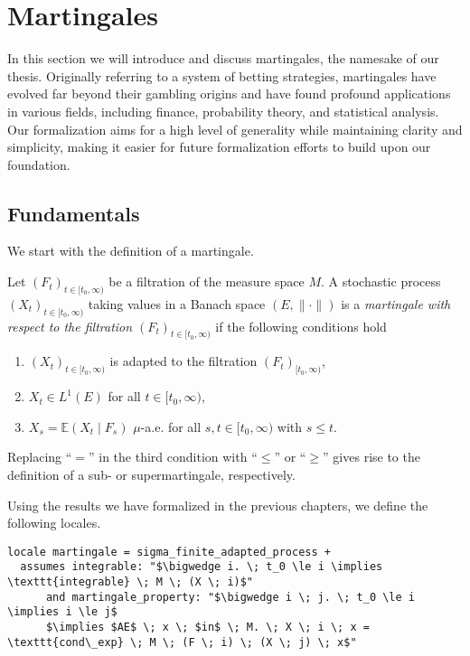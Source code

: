
\chapter{Martingales}\label{chapter:martingales}

In this section we will introduce and discuss martingales, the namesake of our thesis. Originally referring to a system of betting strategies, martingales have evolved far beyond their gambling origins and have found profound applications in various fields, including finance, probability theory, and statistical analysis. Our formalization aims for a high level of generality while maintaining clarity and simplicity, making it easier for future formalization efforts to build upon our foundation.

\section{Fundamentals}

We start with the definition of a martingale.

\begin{definition}
	Let $(F_t)_{t \in [t_0,\infty)}$ be a filtration of the measure space $M$. A stochastic process $(X_t)_{t \in [t_0,\infty)}$ taking values in a Banach space $(E, \lVert \cdot \rVert)$ is a \textit{martingale with respect to the filtration $(F_t)_{t \in [t_0,\infty)}$} if the following conditions hold
	\begin{enumerate}
	\item $(X_t)_{t \in [t_0,\infty)}$ is adapted to the filtration $(F_t)_{[t_0,\infty)}$,
	\item $X_t \in L^1(E)$ for all $t \in [t_0, \infty)$,
	\item $X_s = \mathbb{E}(X_t \;\vert\; F_s)$ $\mu$-a.e. for all $s,t \in [t_0,\infty)$ with $s \le t$.
	\end{enumerate}
	Replacing ``$=$'' in the third condition with ``$\le$'' or ``$\ge$'' gives rise to the definition of a sub- or supermartingale, respectively.
\end{definition}

Using the results we have formalized in the previous chapters, we define the following locales.

\begin{isadefinition}
{\small
\begin{lstlisting}[style=isabelle]
locale martingale = sigma_finite_adapted_process +
  assumes integrable: "$\bigwedge i. \; t_0 \le i \implies \texttt{integrable} \; M \; (X \; i)$"
      and martingale_property: "$\bigwedge i \; j. \; t_0 \le i \implies i \le j$
	  $\implies $AE$ \; x \; $in$ \; M. \; X \; i \; x = \texttt{cond\_exp} \; M \; (F \; i) \; (X \; j) \; x$"
\end{lstlisting}
}
\end{isadefinition}

